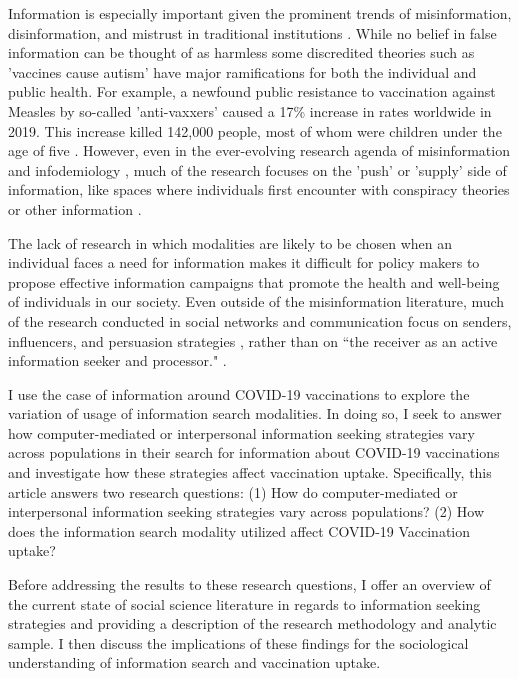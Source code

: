 Information is especially important given the prominent trends of
misinformation, disinformation, and mistrust in traditional institutions
\citep{starbird19, kata10}. While no belief in false information can be thought
of as harmless \citep{douglas21} some discredited theories such as 'vaccines
cause autism' have major ramifications for both the individual and public
health. For example, a newfound public resistance to vaccination against Measles
by so-called 'anti-vaxxers' caused a 17\% increase in rates worldwide in 2019.
This increase killed  142,000 people, most of whom were children under the age
of five \citep{givetash19}. However, even in the ever-evolving research agenda
of misinformation and infodemiology \citep{eysenbach02}, much of the research
focuses on the 'push' or 'supply' side of information, like spaces where
individuals first encounter with conspiracy theories or other information
\citep{johnsonOnlineCompetitionPro2020, broniatowski_etal20}.

The lack of research in which modalities are likely to be chosen when an
individual faces a need for information makes it difficult for policy makers to
propose effective information campaigns that promote the health and well-being
of individuals in our society. Even outside of the misinformation literature,
much of the research conducted in social networks and communication focus on
senders, influencers, and persuasion strategies
\citep{mertonManifestLatentFunctions1968, katzPersonalInfluencePart1955,
lazarsfeldPeopleChoice1944}, rather than on “the receiver as an active
information seeker and processor."
\citep{johnsonComprehensiveModelCancerRelated1993} \citep[for an exception,
see]{eysenbach09}.

I use the case of information around COVID-19 vaccinations to explore the
variation of usage of information search modalities. In doing so, I seek to
answer how computer-mediated or interpersonal information seeking strategies
vary across populations in their search for information about COVID-19
vaccinations and investigate how these strategies affect vaccination uptake.
Specifically, this article answers two research questions: (1) How do
computer-mediated or interpersonal information seeking strategies vary across
populations? (2) How does the information search modality utilized affect
COVID-19 Vaccination uptake?

Before addressing the results to these research questions, I offer an overview
of the current state of social science literature in regards to information
seeking strategies and providing a description of the research methodology and
analytic sample. I then discuss the implications of these findings for the
sociological understanding of information search and vaccination uptake.

